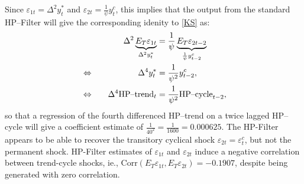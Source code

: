 \documentclass[a4paper,final,12pt]{article}
\begin{document}
Since $\varepsilon _{1t}=\Delta ^{2}y_{t}^{\ast }$ and $\varepsilon _{2t}=%
\frac{1}{\psi }y_{t}^{c}$, this implies that the output from the standard
HP--Filter will give the corresponding idenity to \ref{KS} as:%
\begin{alignat}{2}
& & \Delta ^{2}\underbrace{E_{T}\varepsilon _{1t}}_{\Delta ^{2}y_{t}^{\ast
}}& =\frac{1}{\psi }\underbrace{E_{T}\varepsilon _{2t-2}}_{\frac{1}{\psi }%
y_{t-2}^{c}}  \notag \\
& \Leftrightarrow & \Delta ^{4}y_{t}^{\ast }& =\frac{1}{\psi ^{2}}%
y_{t-2}^{c},  \notag \\
& \Leftrightarrow ~~~ & \Delta ^{4}\text{HP--trend}_{t}& =\frac{1}{\psi ^{2}}%
\text{HP--cycle}_{t-2},  \notag
\end{alignat}%
so that a regression of the fourth differenced HP--trend on a twice lagged
HP--cycle will give a coefficient estimate of $\frac{1}{40^{2}}=\frac{1}{1600%
}=0.000625$. The HP-Filter appears to be able to recover the transitory
cyclical shock $\varepsilon _{2t}=\varepsilon _{t}^{c}$, but not the
permanent shock. HP-Filter estimates of $\varepsilon _{1t}$ and $\varepsilon
_{2t}$ induce a negative correlation between trend-cycle shocks, ie., $%
\mathrm{Corr}(E_{T}\varepsilon _{1t},E_{T}\varepsilon _{2t})=-0.1907$,
despite being generated with zero correlation.

\bigskip

\bigskip

\bigskip

\bigskip

\bigskip

\bigskip

\bigskip

\bigskip

\bigskip

\bigskip

\bigskip

\bigskip

\bigskip

\bigskip
\end{document}
